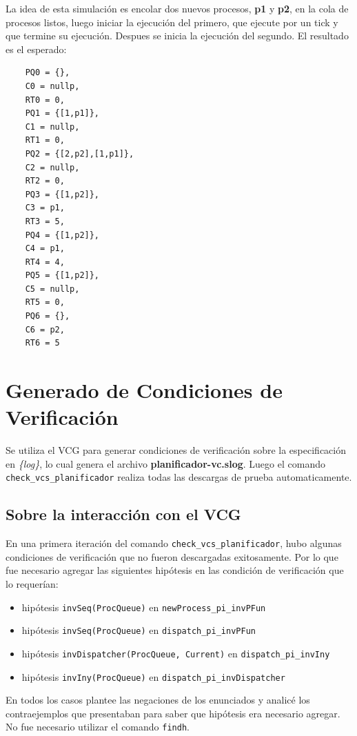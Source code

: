 \documentclass{article}
\begin{document}
La idea de esta simulación es encolar dos nuevos procesos, \textbf{p1} y \textbf{p2}, en la cola de procesos listos, luego iniciar la ejecución del primero, que ejecute por un tick y que termine su ejecución. Despues se inicia la ejecución del segundo. El resultado es el esperado:

\begin{verbatim}
    PQ0 = {},  
    C0 = nullp,  
    RT0 = 0,  
    PQ1 = {[1,p1]},  
    C1 = nullp,  
    RT1 = 0,  
    PQ2 = {[2,p2],[1,p1]},  
    C2 = nullp,  
    RT2 = 0,  
    PQ3 = {[1,p2]},  
    C3 = p1,  
    RT3 = 5,  
    PQ4 = {[1,p2]},  
    C4 = p1,  
    RT4 = 4,  
    PQ5 = {[1,p2]},  
    C5 = nullp,  
    RT5 = 0,  
    PQ6 = {},  
    C6 = p2,  
    RT6 = 5
\end{verbatim}


\section{Generado de Condiciones de Verificación}

Se utiliza el VCG para generar condiciones de verificación sobre la especificación en \textit{\{log\}}, lo cual genera el archivo \textbf{planificador-vc.slog}. Luego el comando \verb|check_vcs_planificador| realiza todas las descargas de prueba automaticamente.

\subsection*{Sobre la interacción con el VCG}

En una primera iteración del comando \verb|check_vcs_planificador|, hubo algunas condiciones de verificación que no fueron descargadas exitosamente. Por lo que fue necesario agregar las siguientes hipótesis en las condición de verificación que lo requerían:

\begin{itemize}
    \item hipótesis \verb|invSeq(ProcQueue)| en \verb|newProcess_pi_invPFun|
    \item hipótesis \verb|invSeq(ProcQueue)| en \verb|dispatch_pi_invPFun|
    \item hipótesis \verb|invDispatcher(ProcQueue, Current)| en \verb|dispatch_pi_invIny|
    \item hipótesis \verb|invIny(ProcQueue)| en \verb|dispatch_pi_invDispatcher|
\end{itemize}

En todos los casos plantee las negaciones de los enunciados y analicé los contraejemplos que presentaban para saber que hipótesis era necesario agregar. No fue necesario utilizar el comando \verb|findh|.
\end{document}
